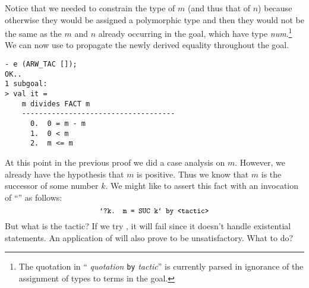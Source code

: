 Notice that we needed to constrain the type of $m$ (and thus that of
$n$) because otherwise they would be assigned a polymorphic type and
then they would not be the same as the $m$ and $n$ already occurring in
the goal, which have type {\it num}.\footnote{The quotation in ``{\it
quotation\/} {\tt by} {\it tactic}'' is currently parsed in ignorance of
the assignment of types to terms in the goal.}
We can now use  to propagate the newly derived equality
throughout the goal.
\begin{session}\begin{verbatim}
- e (ARW_TAC []);
OK..
1 subgoal:
> val it =
    m divides FACT m
    ------------------------------------
      0.  0 = m - m
      1.  0 < m
      2.  m <= m
\end{verbatim}\end{session}
    At this point in the previous proof we did a case analysis on $m$.
    However, we already have the hypothesis that $m$ is positive. Thus
    we know that $m$ is the successor of some number $k$. We might
    like to assert this fact with an invocation of ``'' as
    follows:
\[
    \mbox{\ml{`?k. m = SUC k` by <tactic>}}
\]
But what is the tactic? If we try , it will fail since
it doesn't handle existential statements. An application of
 will also prove to be unsatisfactory. What to do?

